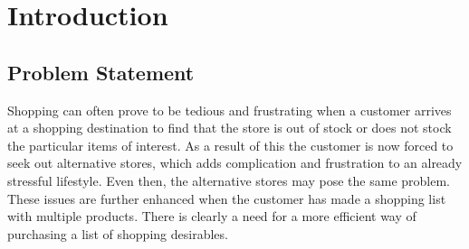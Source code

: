 \documentclass[10pt, a4paper, twocolumn]{scrartcl}
\begin{document}
%		
%		
%
%		
%		
%		

\onecolumn
\section{Introduction}

	\subsection{Problem Statement} 
	
		Shopping can often prove to be tedious and frustrating when a customer arrives at a shopping destination to find that the store is out of stock or does not stock the particular items of interest. As a result of this the customer is now forced to seek out alternative stores, which adds complication and frustration to an already stressful lifestyle. Even then, the alternative stores may pose the same problem. These issues are further enhanced when the customer has made a shopping list with multiple products. There is clearly a need for a more efficient way of purchasing a list of shopping desirables. \\
		
\end{document}

